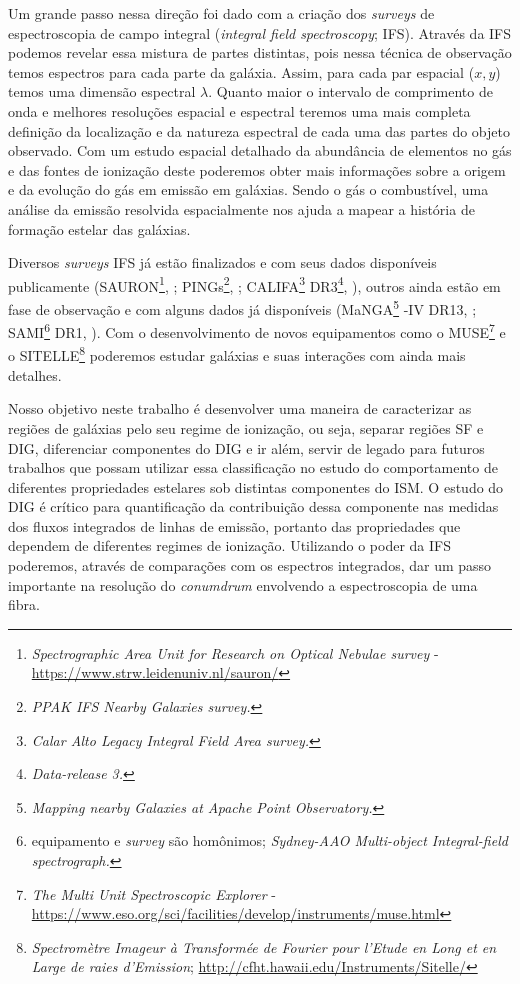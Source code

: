 Um grande passo nessa direção foi dado com a criação dos {\em surveys} de espectroscopia de campo integral ({\em integral field spectroscopy}; IFS). Através da IFS podemos revelar essa mistura de partes distintas, pois nessa técnica de observação temos espectros para cada parte da galáxia. Assim, para cada par espacial ($x,y$) temos uma dimensão espectral $\lambda$. Quanto maior o intervalo de comprimento de onda e melhores resoluções espacial e espectral teremos uma mais completa definição da localização e da natureza espectral de cada uma das partes do objeto observado. Com um estudo espacial detalhado da abundância de elementos no gás e das fontes de ionização deste poderemos obter mais informações sobre a origem e da evolução do gás em emissão em galáxias. Sendo o gás o combustível, uma análise da emissão resolvida espacialmente nos ajuda a mapear a história de formação estelar das galáxias.

Diversos {\em surveys} IFS já estão finalizados e com seus dados disponíveis publicamente (SAURON\footnote{{\em Spectrographic Area Unit for Research on Optical Nebulae survey} - \href{https://www.strw.leidenuniv.nl/sauron/}{https://www.strw.leidenuniv.nl/sauron/}}, \citealt{Bacon.etal.2001}; PINGs\footnote{\em PPAK IFS Nearby Galaxies survey.}, \citealt{RosalesOrtega.etal.2010}; CALIFA\footnote{\em Calar Alto Legacy Integral Field Area survey.} DR3\footnote{\em Data-release 3.}, \citealt{SFSanchez.DR3.2016}), outros ainda estão em fase de observação e com alguns dados já disponíveis (MaNGA\footnote{\em Mapping nearby Galaxies at Apache Point Observatory.} \SDSS-IV DR13, \citealt{MaNGADR1.2017}; SAMI\footnote{equipamento e {\em survey} são homônimos; {\em Sydney-AAO Multi-object Integral-field spectrograph.}} DR1, \citealt{SAMIDR1.2017}). Com o desenvolvimento de novos equipamentos como o MUSE\footnote{{\em The Multi Unit Spectroscopic Explorer} - \href{https://www.eso.org/sci/facilities/develop/instruments/muse.html}{https://www.eso.org/sci/facilities/develop/instruments/muse.html}} e o SITELLE\footnote{{\em Spectromètre Imageur à Transformée de Fourier pour l'Etude en Long et en Large de raies d'Emission}; \href{http://cfht.hawaii.edu/Instruments/Sitelle/}{http://cfht.hawaii.edu/Instruments/Sitelle/}} poderemos estudar galáxias e suas interações com ainda mais detalhes.

Nosso objetivo neste trabalho é desenvolver uma maneira de caracterizar as regiões de galáxias pelo seu regime de ionização, ou seja, separar regiões SF e DIG, diferenciar componentes do DIG e ir além, servir de legado para futuros trabalhos que possam utilizar essa classificação no estudo do comportamento de diferentes propriedades estelares sob distintas componentes do ISM. O estudo do DIG é crítico para quantificação da contribuição dessa componente nas medidas dos fluxos integrados de linhas de emissão, portanto das propriedades que dependem de diferentes regimes de ionização. Utilizando o poder da IFS poderemos, através de comparações com os espectros integrados, dar um passo importante na resolução do {\em conumdrum} envolvendo a espectroscopia de uma fibra.

